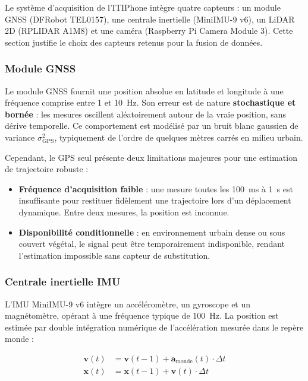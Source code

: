 Le système d'acquisition de l'ITIPhone intègre quatre capteurs : un module GNSS
(DFRobot TEL0157), une centrale inertielle (MiniIMU-9 v6), un LiDAR 2D
(RPLIDAR A1M8) et une caméra (Raspberry Pi Camera Module 3). Cette section
justifie le choix des capteurs retenus pour la fusion de données.

\subsubsection{Module GNSS}

Le module GNSS fournit une position absolue en latitude et longitude à une
fréquence comprise entre 1 et 10~Hz. Son erreur est de nature
\textbf{stochastique et bornée} : les mesures oscillent aléatoirement autour
de la vraie position, sans dérive temporelle. Ce comportement est modélisé
par un bruit blanc gaussien de variance $\sigma^2_{\text{GPS}}$, typiquement de
l'ordre de quelques mètres carrés en milieu urbain.

Cependant, le GPS seul présente deux limitations majeures pour une estimation
de trajectoire robuste :

\begin{itemize}
    \item \textbf{Fréquence d'acquisition faible} : une mesure toutes les
    100~ms à 1~s est insuffisante pour restituer fidèlement une trajectoire
    lors d'un déplacement dynamique. Entre deux mesures, la position est
    inconnue.
    \item \textbf{Disponibilité conditionnelle} : en environnement urbain
    dense ou sous couvert végétal, le signal peut être temporairement
    indisponible, rendant l'estimation impossible sans capteur de substitution.
\end{itemize}

\subsubsection{Centrale inertielle IMU}

L'IMU MiniIMU-9 v6 intègre un accéléromètre, un gyroscope et un magnétomètre,
opérant à une fréquence typique de 100~Hz. La position est estimée par double
intégration numérique de l'accélération mesurée dans le repère monde :

\begin{align}
    \mathbf{v}(t) &= \mathbf{v}(t-1) + \mathbf{a}_{\text{monde}}(t) \cdot \Delta t \\
    \mathbf{x}(t) &= \mathbf{x}(t-1) + \mathbf{v}(t) \cdot \Delta t
\end{align}

